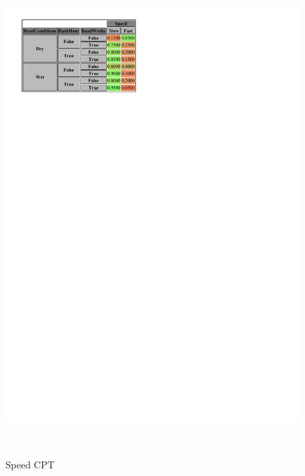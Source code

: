 \documentclass[a4paper,12pt]{article} %
\begin{document}
\begin{figure}[H]
	\begin{center}	
	\begin{minipage}[c]{.5\textwidth}
		\centering
		\includegraphics[width=\linewidth]{../code/speed.pdf}	
		\caption*{Speed CPT}
		\label{fig:speed}
	\end{minipage}
	~
	\begin{minipage}[c]{.45\textwidth}
		\centering

\end{minipage}
\end{center}
\end{figure}
\end{document}
